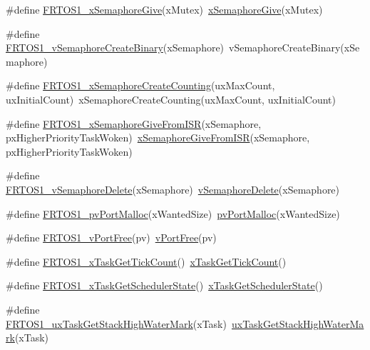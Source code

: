 \begin{DoxyCompactItemize}
\item 
\#define \hyperlink{group___f_r_t_o_s1__module_ga7f2fc0243afeed67a15187eece8a3455}{F\+R\+T\+O\+S1\+\_\+x\+Semaphore\+Give}(x\+Mutex)~\hyperlink{semphr_8h_aae55761cabfa9bf85c8f4430f78c0953}{x\+Semaphore\+Give}(x\+Mutex)
\item 
\#define \hyperlink{group___f_r_t_o_s1__module_gac7aa17de6801646d6be7adf73f5abe9d}{F\+R\+T\+O\+S1\+\_\+v\+Semaphore\+Create\+Binary}(x\+Semaphore)~v\+Semaphore\+Create\+Binary(x\+Semaphore)
\item 
\#define \hyperlink{group___f_r_t_o_s1__module_gaa431f20bcfa36f69179bdb80a798e40a}{F\+R\+T\+O\+S1\+\_\+x\+Semaphore\+Create\+Counting}(ux\+Max\+Count,  ux\+Initial\+Count)~x\+Semaphore\+Create\+Counting(ux\+Max\+Count, ux\+Initial\+Count)
\item 
\#define \hyperlink{group___f_r_t_o_s1__module_ga18a83a2ccf4fa347a7def57ab5da9a24}{F\+R\+T\+O\+S1\+\_\+x\+Semaphore\+Give\+From\+I\+SR}(x\+Semaphore,  px\+Higher\+Priority\+Task\+Woken)~\hyperlink{semphr_8h_a68aa43df8b2a0dbe17d05fad74670ef0}{x\+Semaphore\+Give\+From\+I\+SR}(x\+Semaphore, px\+Higher\+Priority\+Task\+Woken)
\item 
\#define \hyperlink{group___f_r_t_o_s1__module_gabcd302b8e84702f8103fe5f5b3400cf2}{F\+R\+T\+O\+S1\+\_\+v\+Semaphore\+Delete}(x\+Semaphore)~\hyperlink{semphr_8h_acd7d0eda0923d7caeeaaee9202c43eab}{v\+Semaphore\+Delete}(x\+Semaphore)
\item 
\#define \hyperlink{group___f_r_t_o_s1__module_ga142a1a9cfad95cf49afe6405ee62c89d}{F\+R\+T\+O\+S1\+\_\+pv\+Port\+Malloc}(x\+Wanted\+Size)~\hyperlink{portable_8h_a237d63f90b28e0950bd86f76815cd6e3}{pv\+Port\+Malloc}(x\+Wanted\+Size)
\item 
\#define \hyperlink{group___f_r_t_o_s1__module_ga03852f53f5819af76e27fbdb63c7db05}{F\+R\+T\+O\+S1\+\_\+v\+Port\+Free}(pv)~\hyperlink{portable_8h_a735cd3085bb7ba06ff8e47565bfd7016}{v\+Port\+Free}(pv)
\item 
\#define \hyperlink{group___f_r_t_o_s1__module_ga64e1272667e382a1f6f34303551ba5a0}{F\+R\+T\+O\+S1\+\_\+x\+Task\+Get\+Tick\+Count}()~\hyperlink{tasks_8c_a5fa24e36d5e1eeb57f5b73b72ea048e7}{x\+Task\+Get\+Tick\+Count}()
\item 
\#define \hyperlink{group___f_r_t_o_s1__module_ga4c65a3925f657617b2bb70baad5b01ac}{F\+R\+T\+O\+S1\+\_\+x\+Task\+Get\+Scheduler\+State}()~\hyperlink{tasks_8c_a95ee42e80f8afd6815d4b7080717cd7f}{x\+Task\+Get\+Scheduler\+State}()
\item 
\#define \hyperlink{group___f_r_t_o_s1__module_ga69f4c16b76c4b4f247d578fe6a2b5c01}{F\+R\+T\+O\+S1\+\_\+ux\+Task\+Get\+Stack\+High\+Water\+Mark}(x\+Task)~\hyperlink{tasks_8c_a906b3904161aec4874d0fae26c00bf86}{ux\+Task\+Get\+Stack\+High\+Water\+Mark}(x\+Task)

\end{DoxyCompactItemize}
